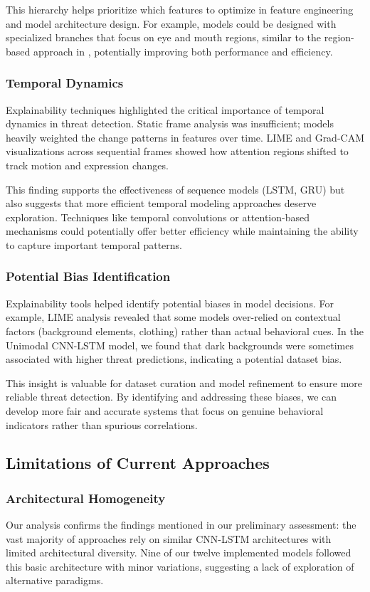 \documentclass[conference,compsoc]{IEEEtran}
\begin{document}
This hierarchy helps prioritize which features to optimize in feature engineering and model architecture design. For example, models could be designed with specialized branches that focus on eye and mouth regions, similar to the region-based approach in \cite{alghowinem2023}, potentially improving both performance and efficiency.

\subsubsection{Temporal Dynamics}
Explainability techniques highlighted the critical importance of temporal dynamics in threat detection. Static frame analysis was insufficient; models heavily weighted the change patterns in features over time. LIME and Grad-CAM visualizations across sequential frames showed how attention regions shifted to track motion and expression changes.

This finding supports the effectiveness of sequence models (LSTM, GRU) but also suggests that more efficient temporal modeling approaches deserve exploration. Techniques like temporal convolutions or attention-based mechanisms could potentially offer better efficiency while maintaining the ability to capture important temporal patterns.

\subsubsection{Potential Bias Identification}
Explainability tools helped identify potential biases in model decisions. For example, LIME analysis revealed that some models over-relied on contextual factors (background elements, clothing) rather than actual behavioral cues. In the Unimodal CNN-LSTM model, we found that dark backgrounds were sometimes associated with higher threat predictions, indicating a potential dataset bias.

This insight is valuable for dataset curation and model refinement to ensure more reliable threat detection. By identifying and addressing these biases, we can develop more fair and accurate systems that focus on genuine behavioral indicators rather than spurious correlations.

\subsection{Limitations of Current Approaches}

\subsubsection{Architectural Homogeneity}
Our analysis confirms the findings mentioned in our preliminary assessment: the vast majority of approaches rely on similar CNN-LSTM architectures with limited architectural diversity. Nine of our twelve implemented models followed this basic architecture with minor variations, suggesting a lack of exploration of alternative paradigms.
\end{document}
